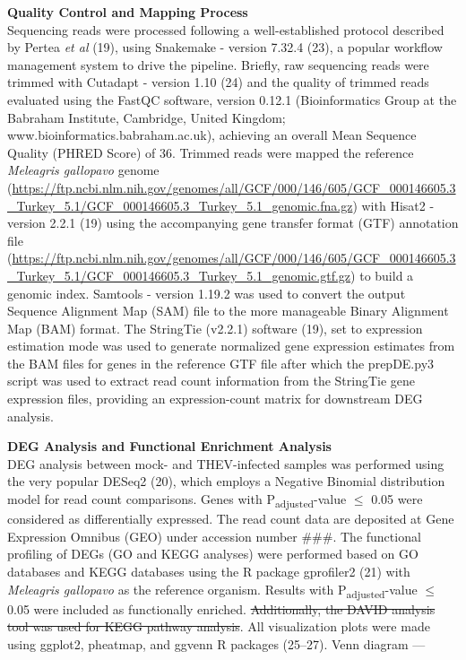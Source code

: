 \documentclass[
]{article}
\begin{document}
\textbf{Quality Control and Mapping Process}\\
Sequencing reads were processed following a well-established protocol
described by Pertea \emph{et al} (19), using Snakemake - version 7.32.4
(23), a popular workflow management system to drive the pipeline.
Briefly, raw sequencing reads were trimmed with Cutadapt - version 1.10
(24) and the quality of trimmed reads evaluated using the FastQC
software, version 0.12.1 (Bioinformatics Group at the Babraham
Institute, Cambridge, United Kingdom;
www.bioinformatics.babraham.ac.uk), achieving an overall Mean Sequence
Quality (PHRED Score) of 36. Trimmed reads were mapped the reference
\emph{Meleagris gallopavo} genome
(\url{https://ftp.ncbi.nlm.nih.gov/genomes/all/GCF/000/146/605/GCF_000146605.3_Turkey_5.1/GCF_000146605.3_Turkey_5.1_genomic.fna.gz})
with Hisat2 - version 2.2.1 (19) using the accompanying gene transfer
format (GTF) annotation file
(\url{https://ftp.ncbi.nlm.nih.gov/genomes/all/GCF/000/146/605/GCF_000146605.3_Turkey_5.1/GCF_000146605.3_Turkey_5.1_genomic.gtf.gz})
to build a genomic index. Samtools - version 1.19.2 was used to convert
the output Sequence Alignment Map (SAM) file to the more manageable
Binary Alignment Map (BAM) format. The StringTie (v2.2.1) software (19),
set to expression estimation mode was used to generate normalized gene
expression estimates from the BAM files for genes in the reference GTF
file after which the prepDE.py3 script was used to extract read count
information from the StringTie gene expression files, providing an
expression-count matrix for downstream DEG analysis.

\textbf{DEG Analysis and Functional Enrichment Analysis}\\
DEG analysis between mock- and THEV-infected samples was performed using
the very popular DESeq2 (20), which employs a Negative Binomial
distribution model for read count comparisons. Genes with
P\textsubscript{adjusted}-value \(\leq\) 0.05 were considered as
differentially expressed. The read count data are deposited at Gene
Expression Omnibus (GEO) under accession number \#\#\#. The functional
profiling of DEGs (GO and KEGG analyses) were performed based on GO
databases and KEGG databases using the R package gprofiler2 (21) with
\emph{Meleagris gallopavo} as the reference organism. Results with
P\textsubscript{adjusted}-value \(\leq\) 0.05 were included as
functionally enriched. \st{Additionally, the DAVID analysis tool was
used for KEGG pathway analysis}. All visualization plots were made using
ggplot2, pheatmap, and ggvenn R packages (25--27). Venn diagram ---
\end{document}
